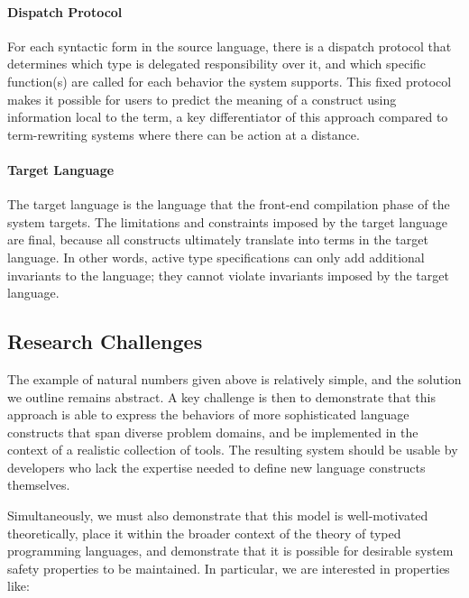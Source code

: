 \paragraph{Dispatch Protocol} For each syntactic form in the source language, there is a dispatch protocol that determines which type is delegated responsibility over it, and which specific function(s) are called for each behavior the system supports. This fixed protocol makes it possible for users to predict the meaning of a construct using information local to the term, a key differentiator of this approach compared to term-rewriting systems where there can be action at a distance.

\paragraph{Target Language} The target language is the language that the front-end compilation phase of the system targets. The limitations and constraints imposed by the target language are final, because all constructs ultimately translate into terms in the target language. In other words, active type specifications can only add additional invariants to the language; they cannot violate invariants imposed by the target language.

\subsection{Research Challenges}
The example of natural numbers given above is relatively simple, and the solution we outline remains abstract. A key challenge is then to demonstrate that this approach is able to express the behaviors of more sophisticated language constructs that span diverse problem domains, and be implemented in the context of a realistic collection of tools. The resulting system should be usable by developers who lack the expertise needed to define new language constructs themselves.

Simultaneously, we must also demonstrate that this model is well-motivated theoretically, place it within the broader context of the theory of typed programming languages, and demonstrate that it is possible for desirable system safety properties to be maintained. In particular, we are interested in properties like:

